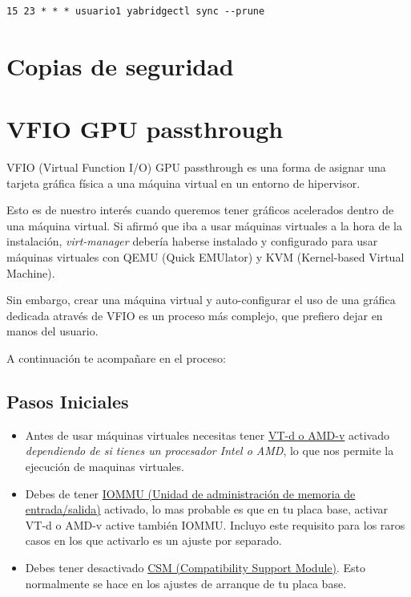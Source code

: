 \documentclass[12pt]{article}
\begin{document}
\begin{verbatim}
15 23 * * * usuario1 yabridgectl sync --prune
\end{verbatim}

\section{Copias de seguridad}

\section{VFIO GPU passthrough}

VFIO (Virtual Function I/O) GPU passthrough es una forma de asignar una tarjeta gráfica física a una máquina virtual en un entorno de hipervisor.

Esto es de nuestro interés cuando queremos tener gráficos acelerados dentro de una máquina virtual. Si afirmó que iba a usar máquinas virtuales a la hora de la instalación, \emph{virt-manager} debería haberse instalado y configurado para usar máquinas virtuales con QEMU (Quick EMUlator) y KVM (Kernel-based Virtual Machine).

Sin embargo, crear una máquina virtual y auto-configurar el uso de una gráfica dedicada através de VFIO es un proceso más complejo, que prefiero dejar en manos del usuario.

A continuación te acompañare en el proceso:

\subsection{Pasos Iniciales}

\begin{itemize}
\setlength\itemsep{-0.2em}
\item Antes de usar máquinas virtuales necesitas tener \href{https://en.wikipedia.org/wiki/X86_virtualization#Intel-VT-d}{VT-d o AMD-v} activado \emph{dependiendo de si tienes un procesador Intel o AMD}, lo que nos permite la ejecución de maquinas virtuales.
\item Debes de tener \href{https://en.wikipedia.org/wiki/Input\%E2\%80\%93output_memory_management_unit}{IOMMU (Unidad de administración de memoria de entrada/salida)} activado, lo mas probable es que en tu placa base, activar VT-d o AMD-v active también IOMMU. Incluyo este requisito para los raros casos en los que activarlo es un ajuste por separado.
\item Debes tener desactivado \href{https://en.wikipedia.org/wiki/UEFI#CSM_booting}{CSM (Compatibility Support Module)}. Esto normalmente se hace en los ajustes de arranque de tu placa base.
\end{itemize}
\end{document}
